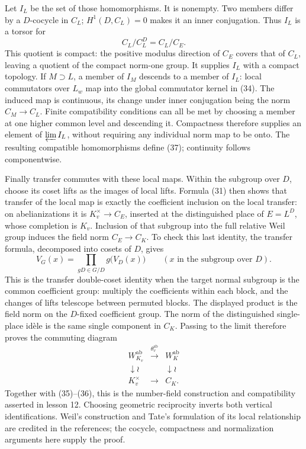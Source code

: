 \documentclass[11pt,a4paper]{article}
\begin{document}
Let \(I_L\) be the set of those homomorphisms. It is nonempty. Two
members differ by a \(D\)-cocycle in \(C_L\); \(H^1(D,C_L)=0\) makes it
an inner conjugation. Thus \(I_L\) is a torsor for \[
C_L/C_L^D=C_L/C_E.
\tag{38}
\] This quotient is compact: the positive modulus direction of \(C_E\)
covers that of \(C_L\), leaving a quotient of the compact norm-one
group. It supplies \(I_L\) with a compact topology. If \(M\supset L\), a
member of \(I_M\) descends to a member of \(I_L\): local commutators
over \(L_w\) map into the global commutator kernel in (34). The induced
map is continuous, its change under inner conjugation being the norm
\(C_M\to C_L\). Finite compatibility conditions can all be met by
choosing a member at one higher common level and descending it.
Compactness therefore supplies an element of \(\varprojlim I_L\),
without requiring any individual norm map to be onto. The resulting
compatible homomorphisms define (37); continuity follows componentwise.

Finally transfer commutes with these local maps. Within the subgroup
over \(D\), choose its coset lifts as the images of local lifts. Formula
(31) then shows that transfer of the local map is exactly the
coefficient inclusion on the local transfer: on abelianizations it is
\(K_v^\times\to C_E\), inserted at the distinguished place of \(E=L^D\),
whose completion is \(K_v\). Inclusion of that subgroup into the full
relative Weil group induces the field norm \(C_E\to C_K\). To check this
last identity, the transfer formula, decomposed into cosets of \(D\),
gives \[
V_G(x)=\prod_{gD\in G/D}g\bigl(V_D(x)\bigr)
\qquad(x\text{ in the subgroup over }D).
\] This is the transfer double-coset identity when the target normal
subgroup is the common coefficient group: multiply the coefficients
within each block, and the changes of lifts telescope between permuted
blocks. The displayed product is the field norm on the \(D\)-fixed
coefficient group. The norm of the distinguished single-place idèle is
the same single component in \(C_K\). Passing to the limit therefore
proves the commuting diagram \[
\begin{array}{ccc}
W_{K_v}^{\mathrm{ab}}&\xrightarrow{\theta_v^{\mathrm{ab}}}&W_K^{\mathrm{ab}}\\
\downarrow\wr&&\downarrow\wr\\
K_v^\times&\longrightarrow&C_K.
\end{array}
\tag{39}
\] Together with (35)--(36), this is the number-field construction and
compatibility asserted in lesson 12. Choosing geometric reciprocity
inverts both vertical identifications. Weil's construction and Tate's
formulation of its local relationship are credited in the references;
the cocycle, compactness and normalization arguments here supply the
proof.
\end{document}
